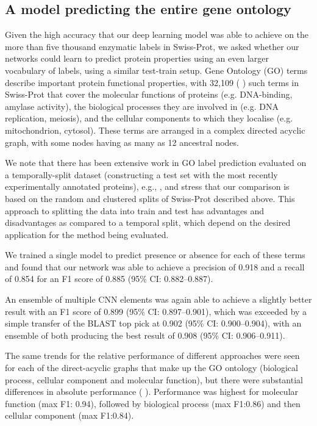 \subsection*{A model predicting the entire gene ontology}
Given the high accuracy that our deep learning model was able to achieve on the more than five thousand enzymatic labels in Swiss-Prot, we asked whether our networks could learn to predict protein properties using an even larger vocabulary of labels, using a similar test-train setup. Gene Ontology \citep{ashburner2000gene, gene2019gene, carbon2009amigo} (GO) terms describe important protein functional properties, with 32,109 (%
) such terms in Swiss-Prot that cover the molecular functions of proteins (e.g. DNA-binding, amylase activity), the biological processes they are involved in (e.g. DNA replication, meiosis), and the cellular components to which they localise (e.g. mitochondrion, cytosol). These terms are arranged in a complex directed acyclic graph, with some nodes having as many as 12 ancestral nodes.


We note that there has been extensive work in GO label prediction evaluated on a temporally-split dataset (constructing a test set with the most recently experimentally annotated proteins), e.g., \citep{zhou2019cafa}, and stress that our comparison is based on the random and clustered splits of Swiss-Prot described above.  This approach to splitting the data into train and test has advantages and disadvantages as compared to a temporal split, which depend on the desired application for the method being evaluated.


We trained a single model to predict presence or absence for each of these terms and found that our network was able to achieve a precision of 0.918 and a recall of 0.854 for an F1 score of 0.885 (95\% CI: 0.882--0.887). 

An ensemble of multiple CNN elements was again able to achieve a slightly better result with an F1 score of 0.899 (95\% CI: 0.897--0.901), which was exceeded by a simple transfer of the BLAST top pick at 0.902 (95\% CI: 0.900--0.904), with an ensemble of both producing the best result of 0.908 (95\% CI: 0.906--0.911).

The same trends for the relative performance of different approaches were seen for each of the direct-acyclic graphs that make up the GO ontology (biological process, cellular component and molecular function), but there were substantial differences in absolute performance (%
). Performance was highest for molecular function (max F1: 0.94), followed by biological process (max F1:0.86) and then cellular component (max F1:0.84).


